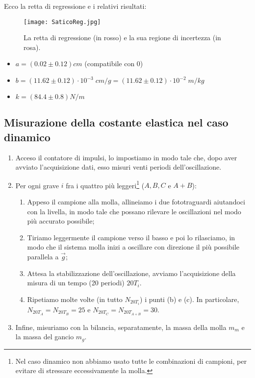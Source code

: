 \documentclass{article}
\begin{document}
Ecco la retta di regressione e i relativi risultati:
\begin{figure}[H]
    \texttt{[image: SaticoReg.jpg]}
    \caption{
        La retta di regressione (in rosso)
        e la sua regione di incertezza (in rosa).
    }
\end{figure}
\begin{itemize}
    \item $a = \left(0.02\pm0.12\right)\unit{cm}$ (compatibile con 0)
    \item $
        b = \left(11.62\pm0.12\right)\cdot10^{-3}\;\unit{cm\per g}
          = \left(11.62\pm0.12\right)\cdot10^{-2}\;\unit{m\per kg}
    $
    \item $k = \left(84.4\pm0.8\right)\unit{N\per m}$
\end{itemize}

\subsection{Misurazione della costante elastica nel caso dinamico}
\begin{enumerate}
    \item Acceso il contatore di impulsi, lo impostiamo in modo tale che,
          dopo aver avviato l'acquisizione dati, esso misuri venti periodi
          dell'oscillazione.
    \item Per ogni grave $i$ fra i quattro più leggeri\footnote[1]{
        Nel caso dinamico non abbiamo usato tutte le combinazioni di campioni,
        per evitare di stressare eccessivamente la molla.
    } ($A, B, C$ e $A+B$):
    \begin{enumerate}
        \item Appeso il campione alla molla, allineiamo i due fototraguardi
              aiutandoci con la livella, in modo tale che possano rilevare
              le oscillazioni nel modo più accurato possibile;
        \item Tiriamo leggermente il campione verso il basso e poi lo rilasciamo,
              in modo che il sistema molla inizi a oscillare con direzione
              il più possibile parallela a $\vec{g}$;
        \item Attesa la stabilizzazione dell’oscillazione, avviamo
              l'acquisizione della misura di un tempo (20 periodi)
              $20T_i$.
        \item Ripetiamo molte volte (in tutto $N_{20T_i}$) i punti
              (b) e (c). In particolare, $N_{20T_A} = N_{20T_B} = 25$
              e $N_{20T_C} = N_{20T_{A+B}} = 30$.
    \end{enumerate}
    \item Infine, misuriamo con la bilancia, separatamente,
          la massa della molla $m_m$ e la massa del gancio $m_g$.
\end{enumerate}
\end{document}
